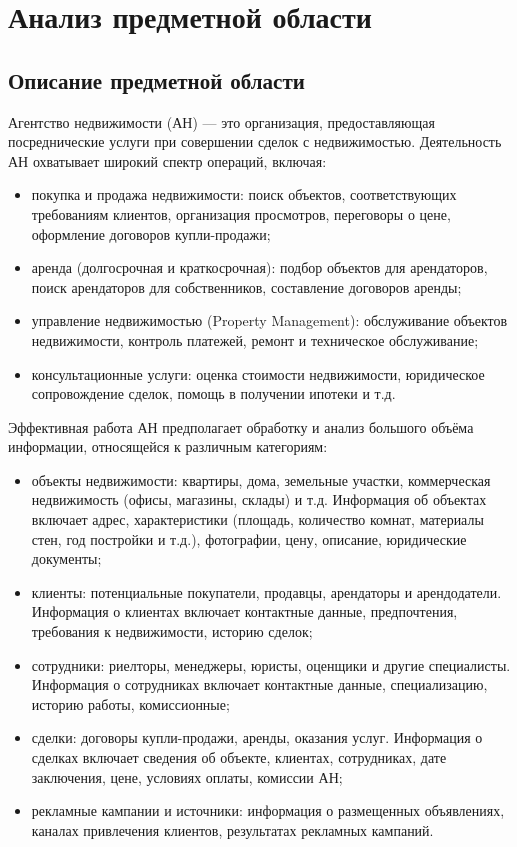 \section{Анализ предметной области}
\subsection{Описание предметной области}

Агентство недвижимости (АН) — это организация, предоставляющая посреднические услуги при совершении сделок с недвижимостью. Деятельность АН охватывает широкий спектр операций, включая:
\begin{itemize}
	\item покупка и продажа недвижимости: поиск объектов, соответствующих требованиям клиентов, организация просмотров, переговоры о цене, оформление договоров купли-продажи;
	\item аренда (долгосрочная и краткосрочная): подбор объектов для арендаторов, поиск арендаторов для собственников, составление договоров аренды;
	\item управление недвижимостью (Property Management): обслуживание объектов недвижимости, контроль платежей, ремонт и техническое обслуживание;
	\item консультационные услуги: оценка стоимости недвижимости, юридическое сопровождение сделок, помощь в получении ипотеки и т.д.
\end{itemize}

Эффективная работа АН предполагает обработку и анализ большого объёма информации, относящейся к различным категориям:
\begin{itemize}
\item объекты недвижимости: квартиры, дома, земельные участки, коммерческая недвижимость (офисы, магазины, склады) и т.д. Информация об объектах включает адрес, характеристики (площадь, количество комнат, материалы стен, год постройки и т.д.), фотографии, цену, описание, юридические документы;
\item клиенты: потенциальные покупатели, продавцы, арендаторы и арендодатели. Информация о клиентах включает контактные данные, предпочтения, требования к недвижимости, историю сделок;
\item сотрудники: риелторы, менеджеры, юристы, оценщики и другие специалисты. Информация о сотрудниках включает контактные данные, специализацию, историю работы, комиссионные;
\item сделки: договоры купли-продажи, аренды, оказания услуг. Информация о сделках включает сведения об объекте, клиентах, сотрудниках, дате заключения, цене, условиях оплаты, комиссии АН;
\item рекламные кампании и источники: информация о размещенных объявлениях, каналах привлечения клиентов, результатах рекламных кампаний.
\end{itemize}

